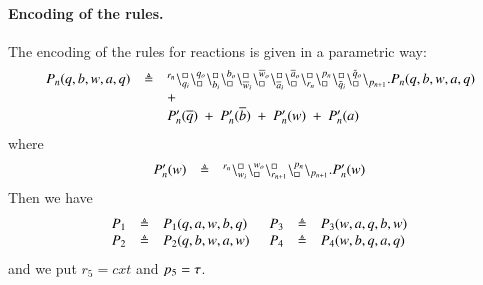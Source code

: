 \paragraph{Encoding of the rules.}
The encoding of the rules for reactions is  given in a parametric way:
\[
\begin{array}{lcl}
P_n(q,b,w,a,q) & \triangleq & {}^{r_n}\backslash_{q_i}^{\scriptstyle {\square}}\backslash_{\scriptstyle {\square}}^{q_o}
                                                    \backslash_{b_i}^{\scriptstyle {\square}}\backslash_{\scriptstyle {\square}}^{b_o}
                                                     \backslash_{\overline{w}_i}^{\scriptstyle {\square}}\backslash_{\scriptstyle {\square}}^{\overline{w}_o}
					        \backslash_{\overline{a}_i}^{\scriptstyle {\square}}\backslash_{\scriptstyle {\square}}^{\overline{a}_o}
					        \backslash_{r_n}^{\scriptstyle {\square}}\backslash_{\scriptstyle {\square}}^{p_n}
					        \backslash_{\tilde{q}_i}^{\scriptstyle {\square}}\backslash_{\scriptstyle {\square}}^{\tilde{q}_o}
			\backslash_{p_{n+1}}.P_n(q,b,w,a,q)  \\
			&& +\\
			&&P_n'(\overline{q}) \ +\ P_n'(\overline{b}) \ + \ P_n'(w)\ +\ P_n'(a)\\
			\end{array}
			\]
			\noindent
			where
			\[
\begin{array}{lcl}
P_n'(w) &\triangleq &  {}^{r_n}\backslash_{w_i}^{\scriptstyle {\square}}\backslash_{\scriptstyle {\square}}^{w_o}\backslash_{r_{n+1}}^{\scriptstyle {\square}}\backslash_{\scriptstyle {\square}}^{p_n} \backslash_{p_{n+1}}.P_n'(w) 
\end{array}
\]
\noindent
Then we have 
\[
\begin{array}{lcl @{\hspace{0.5cm}}lcl  }
P_1 & \defeq & P_1(q,a,w,b,q) & P_3 & \defeq & P_3(w,a,q,b,w)  \\
P_2 & \defeq & P_2(q,b,w,a,w) &P_4 & \defeq & P_4(w,b,q,a,q) 
\end{array}
\]
\noindent
and we put 
$r_5 = cxt$ and  $p_5 = \tau$.

